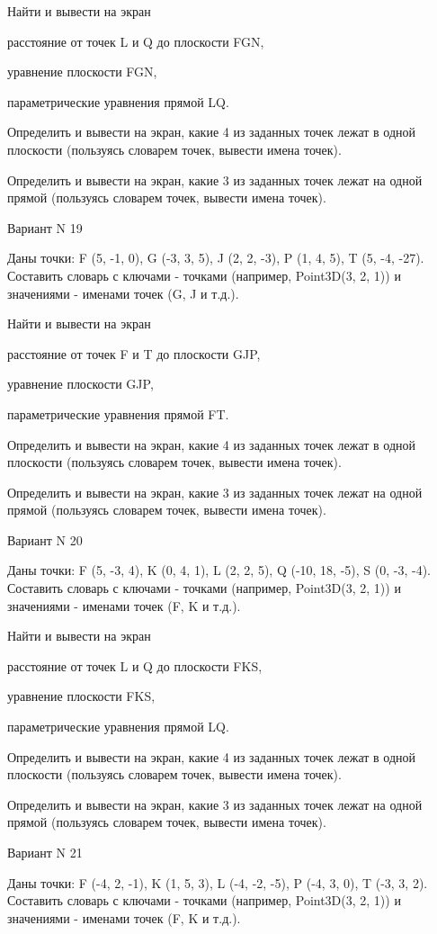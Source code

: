\documentclass[11pt]{report}
\begin{document}
Найти и вывести на экран


расстояние от точек L и Q до плоскости FGN,


уравнение плоскости FGN,


параметрические уравнения прямой LQ.


Определить и вывести на экран, какие 4 из заданных точек лежат в одной плоскости (пользуясь словарем точек, вывести имена точек).


Определить и вывести на экран, какие 3 из заданных точек лежат на одной прямой (пользуясь словарем точек, вывести имена точек).

\newpage
Вариант N 19

Даны точки: F (5, -1, 0), G (-3, 3, 5), J (2, 2, -3), P (1, 4, 5), T (5, -4, -27).
Составить словарь с ключами - точками (например, Point3D(3, 2, 1)) и значениями - именами точек (G, J и т.д.).


Найти и вывести на экран


расстояние от точек F и T до плоскости GJP,


уравнение плоскости GJP,


параметрические уравнения прямой FT.


Определить и вывести на экран, какие 4 из заданных точек лежат в одной плоскости (пользуясь словарем точек, вывести имена точек).


Определить и вывести на экран, какие 3 из заданных точек лежат на одной прямой (пользуясь словарем точек, вывести имена точек).

\newpage
Вариант N 20

Даны точки: F (5, -3, 4), K (0, 4, 1), L (2, 2, 5), Q (-10, 18, -5), S (0, -3, -4).
Составить словарь с ключами - точками (например, Point3D(3, 2, 1)) и значениями - именами точек (F, K и т.д.).


Найти и вывести на экран


расстояние от точек L и Q до плоскости FKS,


уравнение плоскости FKS,


параметрические уравнения прямой LQ.


Определить и вывести на экран, какие 4 из заданных точек лежат в одной плоскости (пользуясь словарем точек, вывести имена точек).


Определить и вывести на экран, какие 3 из заданных точек лежат на одной прямой (пользуясь словарем точек, вывести имена точек).

\newpage
Вариант N 21

Даны точки: F (-4, 2, -1), K (1, 5, 3), L (-4, -2, -5), P (-4, 3, 0), T (-3, 3, 2).
Составить словарь с ключами - точками (например, Point3D(3, 2, 1)) и значениями - именами точек (F, K и т.д.).
\end{document}
